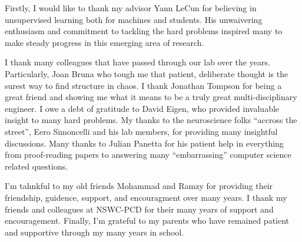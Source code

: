 Firstly, I would like to thank my advisor Yann LeCun for believing in
unsupervised learning both for machines and students. His unwaivering
enthusiasm and commitment to tackling the hard problems inspired many to make
steady progress in this emerging area of research.

I thank many colleagues that have passed through our lab over the years.
Particularly, Joan Bruna who tough me that patient, deliberate thought is the
surest way to find structure in chaos.  I thank Jonathan Tompson for being a
great friend and showing me what it means to be a truly great
multi-disciplinary engineer.  I owe a debt of gratitude to David Eigen, who
provided invaluable insight to many hard problems. My thanks to the
neuroscience folks ``accross the street'', Eero Simoncelli and his lab members,
for providing many insightful discussions. Many thanks to Julian Panetta for
his patient help in everything from proof-reading papers to answering many
``embarrassing'' computer science related questions.  
      
I'm tahnkful to my old friends Mohammad and Ramzy for providing their
friendship, guidence, support, and encouragment over many years.   I thank my
friends and colleagues at NSWC-PCD for their many years of support and
encouragement. Finally, I'm grateful to my parents who have remained patient
and supportive through my many years in school. 


 
